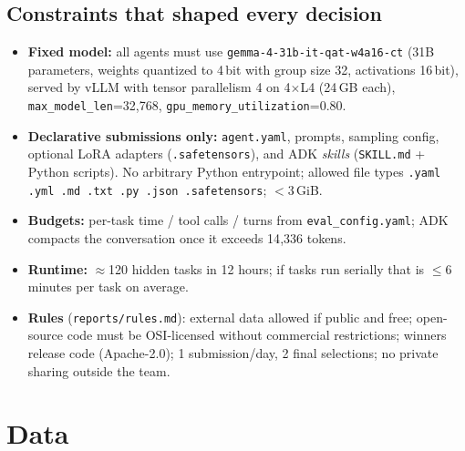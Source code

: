 \documentclass[10pt,a4paper]{article}
\newcommand{\code}[1]{\texttt{#1}}
\newcommand{\1}{\mathbb{1}}
\begin{document}
\subsection{Constraints that shaped every decision}
\begin{itemize}
\item \textbf{Fixed model:} all agents must use \code{gemma-4-31b-it-qat-w4a16-ct} (31B parameters, weights quantized to 4\,bit with group size 32, activations 16\,bit), served by vLLM with tensor parallelism 4 on 4$\times$L4 (24\,GB each), \code{max\_model\_len}=32{,}768, \code{gpu\_memory\_utilization}=0.80.
\item \textbf{Declarative submissions only:} \code{agent.yaml}, prompts, sampling config, optional LoRA adapters (\code{.safetensors}), and ADK \emph{skills} (\code{SKILL.md} + Python scripts). No arbitrary Python entrypoint; allowed file types \code{.yaml .yml .md .txt .py .json .safetensors}; $<$3\,GiB.
\item \textbf{Budgets:} per-task time / tool calls / turns from \code{eval\_config.yaml}; ADK compacts the conversation once it exceeds 14{,}336 tokens.
\item \textbf{Runtime:} $\approx$120 hidden tasks in 12 hours; if tasks run serially that is $\le$6 minutes per task on average.
\item \textbf{Rules} (\code{reports/rules.md}): external data allowed if public and free; open-source code must be OSI-licensed without commercial restrictions; winners release code (Apache-2.0); 1 submission/day, 2 final selections; no private sharing outside the team.
\end{itemize}

\section{Data}
\end{document}
